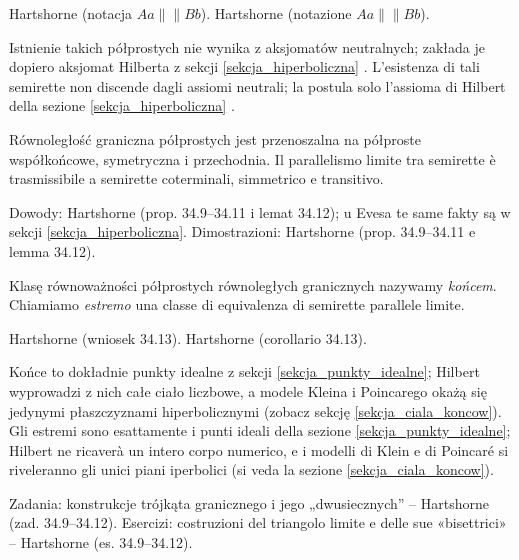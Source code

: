 Hartshorne \cite[s. 312]{hartshorne_2000} (notacja $Aa \parallel\!\!\parallel Bb$). %
Hartshorne \cite[p. 312]{hartshorne_2000} (notazione $Aa \parallel\!\!\parallel Bb$). %

Istnienie takich półprostych nie wynika z aksjomatów neutralnych; zakłada je dopiero aksjomat Hilberta z sekcji \ref{sekcja_hiperboliczna} \cite[s. 313]{hartshorne_2000}. %
L'esistenza di tali semirette non discende dagli assiomi neutrali; la postula solo l'assioma di Hilbert della sezione \ref{sekcja_hiperboliczna} \cite[p. 313]{hartshorne_2000}. %

\begin{proposition}
	Równoległość graniczna półprostych jest przenoszalna na półproste współkońcowe, symetryczna i przechodnia. %
	Il parallelismo limite tra semirette è trasmissibile a semirette coterminali, simmetrico e transitivo. %
\end{proposition}

Dowody: Hartshorne \cite[s. 313--316]{hartshorne_2000} (prop. 34.9--34.11 i lemat 34.12); u Evesa te same fakty są w sekcji \ref{sekcja_hiperboliczna}. %
Dimostrazioni: Hartshorne \cite[p. 313--316]{hartshorne_2000} (prop. 34.9--34.11 e lemma 34.12). %

\begin{definition}
[koniec] %
[estremo] %
	Klasę równoważności półprostych równoległych granicznych nazywamy \emph{końcem}. %
	Chiamiamo \emph{estremo} una classe di equivalenza di semirette parallele limite. %
\end{definition}

Hartshorne \cite[s. 316]{hartshorne_2000} (wniosek 34.13). %
Hartshorne \cite[p. 316]{hartshorne_2000} (corollario 34.13). %

Końce to dokładnie punkty idealne z sekcji \ref{sekcja_punkty_idealne}; Hilbert wyprowadzi z nich całe ciało liczbowe, a modele Kleina i Poincarego okażą się jedynymi płaszczyznami hiperbolicznymi (zobacz sekcję \ref{sekcja_ciala_koncow}). %
Gli estremi sono esattamente i punti ideali della sezione \ref{sekcja_punkty_idealne}; Hilbert ne ricaverà un intero corpo numerico, e i modelli di Klein e di Poincaré si riveleranno gli unici piani iperbolici (si veda la sezione \ref{sekcja_ciala_koncow}). %

Zadania: konstrukcje trójkąta granicznego i jego „dwusiecznych'' -- Hartshorne \cite[s. 317]{hartshorne_2000} (zad. 34.9--34.12). %
Esercizi: costruzioni del triangolo limite e delle sue «bisettrici» -- Hartshorne \cite[p. 317]{hartshorne_2000} (es. 34.9--34.12). %

